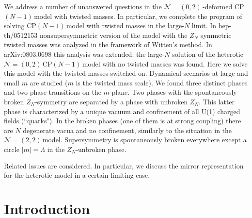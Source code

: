 \documentclass[epsfig,12pt]{article}
\newcommand{\ntt}{${\mathcal N}=(2,2)\,$}
\newcommand{\nzt}{${\mathcal N}=(0,2)\,$}
\newcommand{\cpn}{CP$(N-1)\,$}
\newcommand{\zn}{$Z_N$}
\begin{document}
\begin{titlepage}
\hspace{0.3cm}
We address a number of unanswered questions in the \nzt-deformed \cpn model with
twisted masses.  In particular, we complete the program of solving \cpn model with twisted masses in the large-$N$
limit. In hep-th/0512153 nonsupersymmetric version of the model with the $Z_N$
symmetric twisted masses was analyzed in the framework of Witten's method. In arXiv:0803.0698 
this analysis was extended:  the  large-$N$ solution of the heterotic \nzt \cpn model with no twisted masses was found. Here we solve this  model with the twisted
masses switched on. Dynamical scenarios at large and small $m$ are studied
($m$ is the twisted mass scale). We found three distinct phases and two phase transitions on the $m$ plane. 
Two phases with the spontaneously broken  \zn-symmetry are separated by a phase with unbroken \zn. This latter phase is characterized by a unique vacuum and confinement of all U(1) charged fields (``quarks").
In the broken phases (one of them is at strong coupling) there are $N$ degenerate vacua
and no confinement, similarly to the situation in the \ntt model.
Supersymmetry is spontaneously broken everywhere except a circle $|m|=\Lambda$ in the \zn-unbroken phase. 

Related issues are considered. In particular, we discuss the mirror representation for the heterotic model in a certain limiting case.

\vspace{2cm}




\end{titlepage}

\newpage

\tableofcontents

\newpage

\section{Introduction}
\setcounter{equation}{0}
\end{document}
